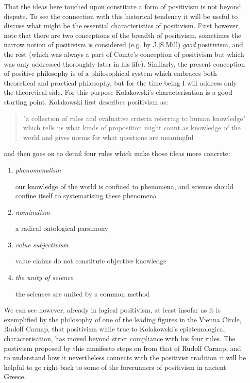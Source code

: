 That the ideas here touched upon constitute a form of positivism is not beyond dispute.
To see the connection with this historical tendency it will be useful to discuss what might be the essential characteristics of positivism.
First however, note that there are two conceptions of the breadth of positivism, sometimes the narrow notion of positivism is considered (e.g. by J.|S.Mill) \emph{good} positivism, and the rest (which was always a part of Comte's conception of positivism but which was only addressed thoroughly later in his life).
Similarly, the present conception of positive philosophy is of a philosophical system which embraces both theoretical and practical philosophy, but for the time being I will address only the theoretical side.
For this purpose Kolakowski's characterisation is a good starting point.
Kolakowski first describes positivism as:
\begin{quotation}
"a collection of rules and evaluative criteria referring to human knowledge" which tells us what kinds of proposition might count as knowledge of the world and gives norms for what questions are meaningful
\end{quotation}
and then goes on to detail four rules which make those ideas more concrete:

\begin{enumerate}
\item \emph{phenomenalism}

our knowledge of the world is confined to phenomena, and science should confine itself to systematising these phenomena
\item \emph{nominalism}

a radical ontological parsimony
\item \emph{value subjectivism}

value claims do not constitute objective knowledge
\item \emph{the unity of science}

the sciences are united by a common method
\end{enumerate}

We can see however, already in logical positivism, at least insofar as it is exemplified by the philosophy of one of the leading figures in the Vienna Circle, Rudolf Carnap, that positivism while true to Kolakowski's epistemological characterisation, has moved beyond strict compliance with his four rules.
The postivism proposed by this manifesto steps on from that of Rudolf Carnap, and to understand how it nevertheless connects with the positivist tradition it will be helpful to go right back to some of the forerunners of positivism in ancient Greece.

